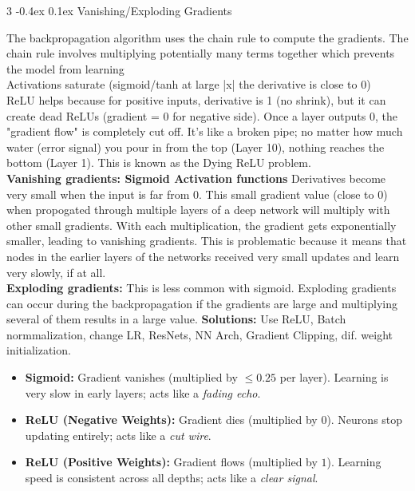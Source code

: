 \documentclass[8pt,landscape]{article}
\makeatletter
\renewcommand{\subsection}{\@startsection{subsection}{2}{0pt}%
    {-0.4ex}%
    {0.1ex}%
    {\fontsize{8}{9}\bfseries\color{blue}}}
\newcommand{\smalltext}[1]{%
  {\fontsize{8}{9}\selectfont\sloppy #1\par}%
}
\makeatother
\begin{document}
\begin{multicols}{3}
\subsection{Vanishing/Exploding Gradients}
\smalltext{
The backpropagation algorithm uses the chain rule to compute the gradients.
The chain rule involves multiplying potentially many terms together which prevents the model from learning\\
Activations saturate (sigmoid/tanh at large |x| the derivative is close to 0) \\
ReLU helps because for positive inputs, derivative is 1 (no shrink), but it can create dead ReLUs (gradient = 0 for negative side). Once a layer outputs 0, the "gradient flow" is completely cut off. It's like a broken pipe; no matter how much water (error signal) you pour in from the top (Layer 10), nothing reaches the bottom (Layer 1). This is known as the Dying ReLU problem. \\
\textbf{Vanishing gradients: Sigmoid Activation functions} Derivatives become very small when the input is far from 0. This small gradient value (close to 0) when propogated through multiple layers of a deep network will multiply with other small gradients. 
With each multiplication, the gradient gets exponentially smaller, leading to vanishing gradients. This is problematic because it means that nodes in the earlier layers of the networks received very small updates and learn very slowly, if at all. \\
\textbf{Exploding gradients:} This is less common with sigmoid. Exploding gradients can occur during the backpropagation if the gradients are large and multiplying several of them results in a large value.
\textbf{Solutions:} Use ReLU, Batch normmalization, change LR, ResNets, NN Arch, Gradient Clipping, dif. weight initialization.
}
\begin{itemize}
    \item \textbf{Sigmoid:} Gradient vanishes (multiplied by $\le 0.25$ per layer). Learning is very slow in early layers; acts like a \textit{fading echo}.
    \item \textbf{ReLU (Negative Weights):} Gradient dies (multiplied by $0$). Neurons stop updating entirely; acts like a \textit{cut wire}.
    \item \textbf{ReLU (Positive Weights):} Gradient flows (multiplied by $1$). Learning speed is consistent across all depths; acts like a \textit{clear signal}.
\end{itemize}

\end{multicols}
\end{document}

